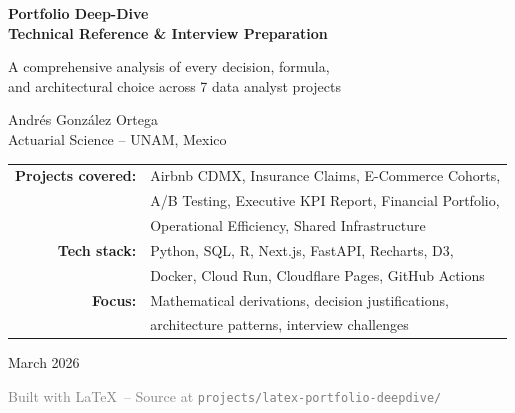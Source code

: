 
\begin{titlepage}
\begin{center}

\vspace*{2cm}

{\Huge\bfseries Portfolio Deep-Dive}\\[0.5cm]
{\Large\bfseries Technical Reference \& Interview Preparation}

\vspace{1.5cm}

{\large A comprehensive analysis of every decision, formula,\\
and architectural choice across 7 data analyst projects}

\vspace{2cm}


\vspace{1cm}

{\Large Andr\'es Gonz\'alez Ortega}\\[0.3cm]
{\normalsize Actuarial Science -- UNAM, Mexico}

\vspace{1.5cm}

\begin{tabular}{rl}
\textbf{Projects covered:} & Airbnb CDMX, Insurance Claims, E-Commerce Cohorts, \\
                           & A/B Testing, Executive KPI Report, Financial Portfolio, \\
                           & Operational Efficiency, Shared Infrastructure \\[0.5cm]
\textbf{Tech stack:}       & Python, SQL, R, Next.js, FastAPI, Recharts, D3, \\
                           & Docker, Cloud Run, Cloudflare Pages, GitHub Actions \\[0.5cm]
\textbf{Focus:}            & Mathematical derivations, decision justifications, \\
                           & architecture patterns, interview challenges
\end{tabular}

\vspace{2cm}

{\large March 2026}

\vfill

{\small\textcolor{gray}{Built with \LaTeX\ -- Source at \texttt{projects/latex-portfolio-deepdive/}}}

\end{center}
\end{titlepage}

